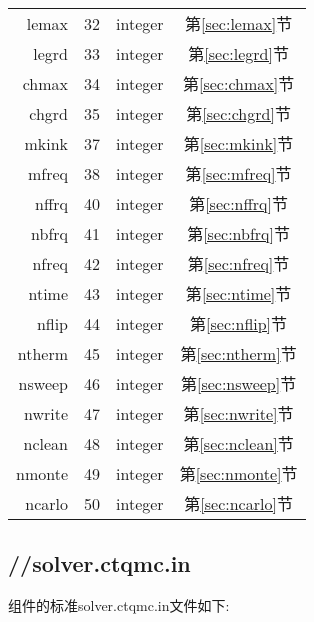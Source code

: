 \begin{longtable}{rccc}
lemax    & 32       & integer  &第\ref{sec:lemax}节 \\
legrd    & 33       & integer  &第\ref{sec:legrd}节 \\
chmax    & 34       & integer  &第\ref{sec:chmax}节 \\
chgrd    & 35       & integer  &第\ref{sec:chgrd}节 \\
mkink    & 37       & integer  &第\ref{sec:mkink}节 \\
mfreq    & 38       & integer  &第\ref{sec:mfreq}节 \\
nffrq    & 40       & integer  &第\ref{sec:nffrq}节 \\
nbfrq    & 41       & integer  &第\ref{sec:nbfrq}节 \\
nfreq    & 42       & integer  &第\ref{sec:nfreq}节 \\
ntime    & 43       & integer  &第\ref{sec:ntime}节 \\
nflip    & 44       & integer  &第\ref{sec:nflip}节 \\
ntherm   & 45       & integer  &第\ref{sec:ntherm}节\\
nsweep   & 46       & integer  &第\ref{sec:nsweep}节\\
nwrite   & 47       & integer  &第\ref{sec:nwrite}节\\
nclean   & 48       & integer  &第\ref{sec:nclean}节\\
nmonte   & 49       & integer  &第\ref{sec:nmonte}节\\
ncarlo   & 50       & integer  &第\ref{sec:ncarlo}节\\
\hline
\hline
\end{longtable}

\subsection{{\begonia}//solver.ctqmc.in}

{\begonia}组件的标准solver.ctqmc.in文件如下:


